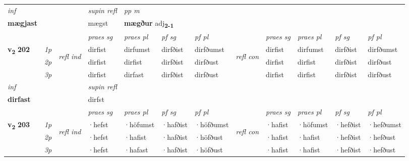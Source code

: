 \begin{longtable}[l]{X>{\footnotesize\itshape}llXXXXlXXXX}
   {\textit{inf}} & &       & \textit{supin refl} & \textit{pp m} \\*
  {\textbf{mægjast}} & &       & mægst & \multicolumn{2}{l}{\textbf{mægður} adj\textbf{\textsubscript{2-1}}} \\*

\midrule

 & &   & \textit{praes sg}  & \textit{praes pl}    & \textit{ pf sg} & \textit{pf pl} & & \textit{praes sg}  & \textit{praes pl}    & \textit{pf sg} & \textit{pf pl }  \\ \cmidrule{4-7} \cmidrule{9-12}
 \multirow{2}{*}{{{\textbf{v{\textsubscript{2}}} \Large{\textbf{202}}}}}  & 1p & \multirow{3}{*}{\begin{turn}{90}\textit{refl ind}\end{turn}}  & dirfist & dirfumst & dirfðist & dirfðumst & \multirow{3}{*}{\begin{turn}{90}\textit{refl con}\end{turn}}  &dirfist & dirfumst & dirfðist & dirfðumst \\*
 & 2p &  & dirfist & dirfist & dirfðist & dirfðust & &dirfist & dirfist & dirfðist & dirfðust \\*
 & 3p  & & dirfist & dirfast & dirfðist & dirfðust & & dirfist & dirfist& dirfðist & dirfðust \\*
\cmidrule{4-7} \cmidrule{9-12}

   {\textit{inf}} & &       & \textit{supin refl}  \\*
  {\textbf{dirfast}} & &       & dirfst  \\*

\midrule

 & &   & \textit{praes sg}  & \textit{praes pl}    & \textit{ pf sg} & \textit{pf pl} & & \textit{praes sg}  & \textit{praes pl}    & \textit{pf sg} & \textit{pf pl }  \\ \cmidrule{4-7} \cmidrule{9-12}
 \multirow{2}{*}{{{\textbf{v{\textsubscript{2}}} \Large{\textbf{203}}}}}  & 1p & \multirow{3}{*}{\begin{turn}{90}\textit{refl ind}\end{turn}}  & ·hefst & ·höfumst & ·hafðist & ·höfðumst & \multirow{3}{*}{\begin{turn}{90}\textit{refl con}\end{turn}}  &·hafist & ·höfumst & ·hefðist & ·hefðumst \\*
 & 2p &  & ·hefst & ·hafist & ·hafðist & ·höfðust & &·hafist & ·hafist & ·hefðist & ·hefðust \\*
 & 3p  & & ·hefst & ·hafast & ·hafðist & ·höfðust & & ·hafist & ·hafist& ·hefðist & ·hefðust \\*
\cmidrule{4-7} \cmidrule{9-12}


\end{longtable}
